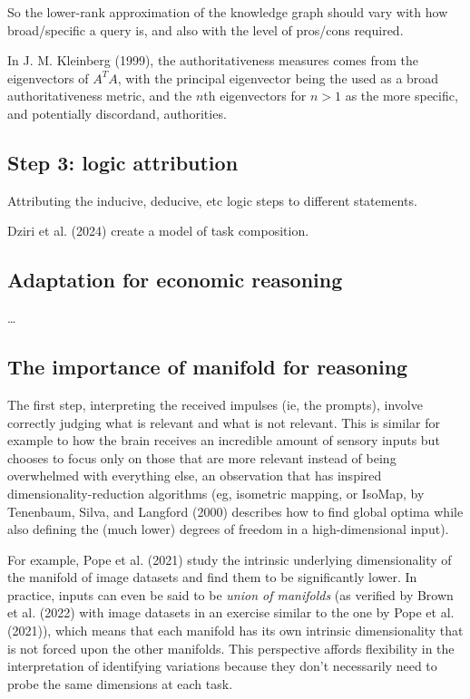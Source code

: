 \documentclass[
]{article}
\begin{document}
So the lower-rank approximation of the knowledge graph should vary with
how broad/specific a query is, and also with the level of pros/cons
required.

In J. M. Kleinberg (1999), the authoritativeness measures comes from the
eigenvectors of \(A^TA\), with the principal eigenvector being the used
as a broad authoritativeness metric, and the \(n\)th eigenvectors for
\(n>1\) as the more specific, and potentially discordand, authorities.

\subsection{Step 3: logic attribution}\label{step-3-logic-attribution}

Attributing the inducive, deducive, etc logic steps to different
statements.

Dziri et al. (2024) create a model of task composition.

\subsection{Adaptation for economic
reasoning}\label{adaptation-for-economic-reasoning}

\ldots{}

\subsection{The importance of manifold for
reasoning}\label{the-importance-of-manifold-for-reasoning}

The first step, interpreting the received impulses (ie, the prompts),
involve correctly judging what is relevant and what is not relevant.
This is similar for example to how the brain receives an incredible
amount of sensory inputs but chooses to focus only on those that are
more relevant instead of being overwhelmed with everything else, an
observation that has inspired dimensionality-reduction algorithms (eg,
isometric mapping, or IsoMap, by Tenenbaum, Silva, and Langford (2000)
describes how to find global optima while also defining the (much lower)
degrees of freedom in a high-dimensional input).

For example, Pope et al. (2021) study the intrinsic underlying
dimensionality of the manifold of image datasets and find them to be
significantly lower. In practice, inputs can even be said to be
\emph{union of manifolds} (as verified by Brown et al. (2022) with image
datasets in an exercise similar to the one by Pope et al. (2021)), which
means that each manifold has its own intrinsic dimensionality that is
not forced upon the other manifolds. This perspective affords
flexibility in the interpretation of identifying variations because they
don't necessarily need to probe the same dimensions at each task.
\end{document}
